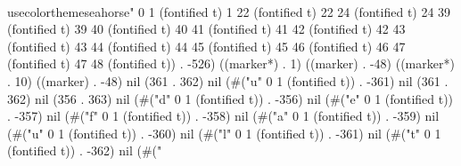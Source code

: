 \\usecolortheme{seahorse}" 0 1 (fontified t) 1 22 (fontified t) 22 24 (fontified t) 24 39 (fontified t) 39 40 (fontified t) 40 41 (fontified t) 41 42 (fontified t) 42 43 (fontified t) 43 44 (fontified t) 44 45 (fontified t) 45 46 (fontified t) 46 47 (fontified t) 47 48 (fontified t)) . -526) ((marker*) . 1) ((marker) . -48) ((marker*) . 10) ((marker) . -48) nil (361 . 362) nil (#("u" 0 1 (fontified t)) . -361) nil (361 . 362) nil (356 . 363) nil (#("d" 0 1 (fontified t)) . -356) nil (#("e" 0 1 (fontified t)) . -357) nil (#("f" 0 1 (fontified t)) . -358) nil (#("a" 0 1 (fontified t)) . -359) nil (#("u" 0 1 (fontified t)) . -360) nil (#("l" 0 1 (fontified t)) . -361) nil (#("t" 0 1 (fontified t)) . -362) nil (#("    %